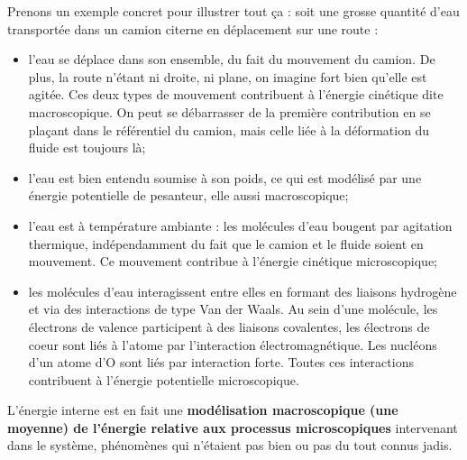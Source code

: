 \documentclass[11pt,a4paper]{report}
\begin{document}
Prenons un exemple concret pour illustrer tout ça : soit une grosse quantité d'eau transportée dans un camion citerne en déplacement sur une route :
\begin{itemize}
	\item l'eau se déplace dans son ensemble, du fait du mouvement du camion. De plus, la route n'étant ni droite, ni plane, on imagine fort bien qu'elle est agitée. Ces deux types de mouvement contribuent à l'énergie cinétique dite macroscopique. On peut se débarrasser de la première contribution en se plaçant dans le référentiel du camion, mais celle liée à la déformation du fluide est toujours là;
	\item l'eau est bien entendu soumise à son poids, ce qui est modélisé par une énergie potentielle de pesanteur, elle aussi macroscopique;
	\item l'eau est à température ambiante : les molécules d'eau bougent par agitation thermique, indépendamment du fait que le camion et le fluide soient en mouvement. Ce mouvement contribue à l'énergie cinétique microscopique;
	\item les molécules d'eau interagissent entre elles en formant des liaisons hydrogène et via des interactions de type Van der Waals. Au sein d'une molécule, les électrons de valence participent à des liaisons covalentes, les électrons de coeur sont liés à l'atome par l'interaction électromagnétique. Les nucléons d'un atome d'O sont liés par interaction forte. Toutes ces interactions contribuent à l'énergie potentielle microscopique.\\
\end{itemize}

L'énergie interne est en fait une \textbf{modélisation macroscopique (une moyenne) de l'énergie relative aux processus microscopiques} intervenant dans le système, phénomènes qui n'étaient pas bien ou pas du tout connus jadis.
\end{document}
